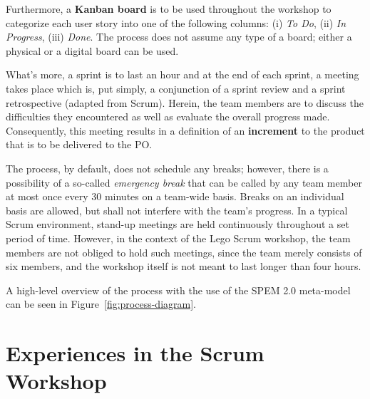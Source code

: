 \documentclass[conference]{IEEEtran}
\begin{document}
Furthermore, a \textbf{Kanban board} is to be used throughout the workshop to
categorize each user story into one of the following columns: (i) \textit{To
Do}, (ii) \textit{In Progress}, (iii) \textit{Done}. The process does not
assume any type of a board; either a physical or a digital board can be used.

What's more, a sprint is to last an hour and at the end of each sprint, a
meeting takes place which is, put simply, a conjunction of a sprint review and
a sprint retrospective (adapted from Scrum). Herein, the team members are to
discuss the difficulties they encountered as well as evaluate the overall
progress made. Consequently, this meeting results in a definition of an
\textbf{increment} to the product that is to be delivered to the PO.

The process, by default, does not schedule any breaks; however, there is a
possibility of a so-called \textit{emergency break} that can be called by any
team member at most once every 30 minutes on a team-wide basis.
Breaks on an individual basis are allowed, but shall not interfere with the
team's progress. In a typical Scrum environment, stand-up meetings are held
continuously throughout a set period of time. However, in the context of the
Lego Scrum workshop, the team members are not obliged to hold such meetings,
since the team merely consists of six members, and the workshop itself is not
meant to last longer than four hours.

A high-level overview of the process with the use of the SPEM 2.0 meta-model
can be seen in Figure~\ref{fig:process-diagram}.


\section{Experiences in the Scrum Workshop}
\label{sec:experiences}

\end{document}
